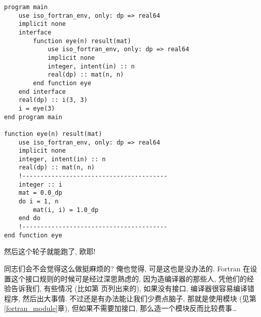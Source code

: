 \begin{lstlisting} 
program main
    use iso_fortran_env, only: dp => real64
    implicit none
    interface
        function eye(n) result(mat)
            use iso_fortran_env, only: dp => real64
            implicit none
            integer, intent(in) :: n
            real(dp) :: mat(n, n)
        end function eye
    end interface
    real(dp) :: i(3, 3)
    i = eye(3)
end program main

function eye(n) result(mat)
    use iso_fortran_env, only: dp => real64
    implicit none
    integer, intent(in) :: n
    real(dp) :: mat(n, n)
    !----------------------------------------
    integer :: i
    mat = 0.0_dp
    do i = 1, n
        mat(i, i) = 1.0_dp
    end do
    !----------------------------------------
end function eye
\end{lstlisting} 
然后这个轮子就能跑了, 欧耶!

同志们会不会觉得这么做挺麻烦的? 俺也觉得, 可是这也是没办法的. Fortran 在设置这个接口规则的时候可是经过深思熟虑的, 因为造编译器的那些人, 凭他们的经验告诉我们, 有些情况 (比如第 \pageref{whether_specific_interface} 页列出来的), 如果没有接口, 编译器很容易编译错程序, 然后出大事情. 不过还是有办法能让我们少费点脑子, 那就是使用模块 (见第\ref{fortran_module}章), 但如果不需要加接口, 那么造一个模块反而比较费事\dots{}

